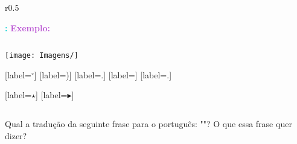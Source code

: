 \begin{figure}[h]
    \centering
    \caption{}
    \label{fig:}
\end{figure}

\begin{wrapfigure}{r}{0.5\textwidth}
    \centering
    \caption{}
    \label{fig:}
\end{wrapfigure}

\textcolor{DarkTurquoise}{\textbf{:}}
\textcolor{MediumOrchid}{\textbf{Exemplo:}}



\textcolor{CarnationPink}{$$}

\begin{center}
\texttt{[image: Imagens/]}
\end{center}

[label=\textcolor{CarnationPink}{\arabic*${}^\circ $}]
[label=\textcolor{CarnationPink}{\alph*)}]
[label=\textcolor{CarnationPink}{\roman*.}]
[label=\textcolor{CarnationPink}{\textopenbullet}]
[label=\textcolor{CarnationPink}{\arabic*.}]

[label=\textcolor{CarnationPink}{$\star$}]
[label=\textcolor{CarnationPink}{$\blacktriangleright$}]

\textcolor{CarnationPink}{$\mathbf{}$}

\textcolor{DarkTurquoise}{\textbf{}}


\begin{tcolorbox}[width=\textwidth, colback={white}, colbacktitle={DarkTurquoise!50!white}, title={$\bigstar$ \LobsterTwo{Observação} $\bigstar $}, coltitle={CarnationPink}, colframe={DarkTurquoise}, fonttitle=\rmfamily\bfseries\Large]

\end{tcolorbox}

Qual a tradução da seguinte frase para o português: ""? O que essa frase quer dizer?

